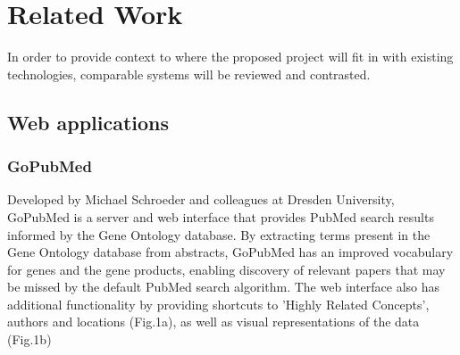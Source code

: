 \documentclass[PROP_AGutteridge_CS.tex]{subfiles}
\begin{document}
\chapter{Related Work}
In order to provide context to where the proposed project will fit in with existing technologies, comparable systems will be reviewed and contrasted. 

\section{Web applications}
\subsection{GoPubMed}
Developed by Michael Schroeder and colleagues at Dresden University, GoPubMed is a server and web interface that provides PubMed search results informed by the Gene Ontology database\cite{doms}. By extracting terms present in the Gene Ontology database from abstracts, GoPubMed has an improved vocabulary for genes and the gene products, enabling discovery of relevant papers that may be missed by the default PubMed search algorithm. The web interface also has additional functionality by providing shortcuts to 'Highly Related Concepts', authors and locations (Fig.1a), as well as visual representations of the data (Fig.1b) \\
\end{document}

